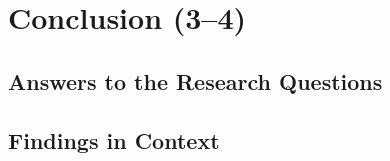\cleardoublepage
\chapter{Conclusion (3--4)}   %
\label{ch:conclusion}

\section{Answers to the Research Questions}
\label{sec:conc-answers}

\section{Findings in Context}
\label{sec:conc-context}

